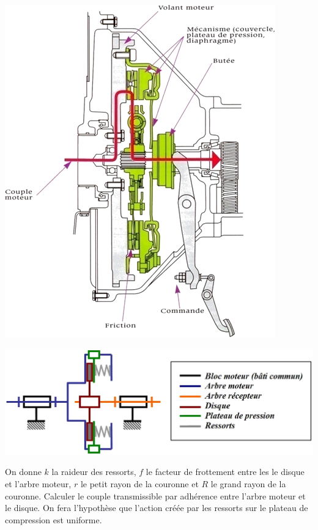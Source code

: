 \documentclass[10pt]{article}
\begin{document}
\begin{minipage}[c]{.3\linewidth}
\begin{center}
\includegraphics[width=.95\textwidth]{images/embrayage}
\end{center}
\end{minipage}\hfill
\begin{minipage}[c]{.65\linewidth}
\begin{center}
\includegraphics[width=.95\textwidth]{images/embrayage2}
\end{center}
\end{minipage}


On donne $k$ la raideur des ressorts, $f$ le facteur de frottement entre les le disque et l'arbre moteur, $r$ le petit rayon de la couronne et $R$ le grand rayon de la couronne. Calculer le couple transmissible par adhérence entre l'arbre moteur et le disque. On fera l'hypothèse que l'action créée par les ressorts sur le plateau de compression est uniforme. 
\end{document}
